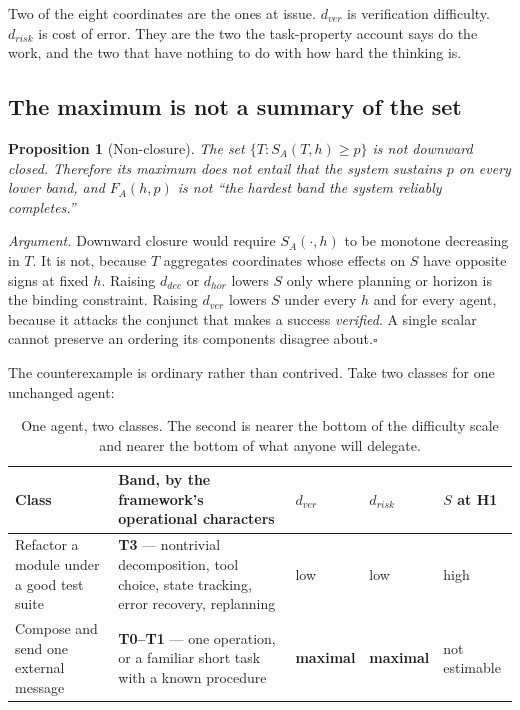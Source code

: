 \documentclass[11pt]{article}
\newtheorem{proposition}{Proposition}
\theoremstyle{definition}
\newcommand{\dver}{\ensuremath{d_{ver}}}
\newcommand{\drisk}{\ensuremath{d_{risk}}}
\begin{document}
Two of the eight coordinates are the ones at issue. \dver{} is verification difficulty. \drisk{} is cost of error. They are the two the task-property account says do the work, and the two that have nothing to do with how hard the thinking is.

\subsection{The maximum is not a summary of the set}\label{sec:closure}

\begin{proposition}[Non-closure]\label{prop:closure}
The set $\{T : S_A(T,h)\ge p\}$ is not downward closed. Therefore its maximum does not entail that the system sustains $p$ on every lower band, and $F_A(h,p)$ is not ``the hardest band the system reliably completes.''
\end{proposition}

\emph{Argument.} Downward closure would require $S_A(\cdot,h)$ to be monotone decreasing in $T$. It is not, because $T$ aggregates coordinates whose effects on $S$ have opposite signs at fixed $h$. Raising $d_{dec}$ or $d_{hor}$ lowers $S$ only where planning or horizon is the binding constraint. Raising \dver{} lowers $S$ under every $h$ and for every agent, because it attacks the conjunct that makes a success \emph{verified}. A single scalar cannot preserve an ordering its components disagree about.\hfill$\square$

The counterexample is ordinary rather than contrived. Take two classes for one unchanged agent:

\begin{table}[h]
\centering\small
\begin{tabularx}{\textwidth}{@{}lYlll@{}}
\toprule
Class & Band, by the framework's operational characters & \dver{} & \drisk{} & $S$ at H1 \\
\midrule
Refactor a module under a good test suite & \textbf{T3} --- nontrivial decomposition, tool choice, state tracking, error recovery, replanning & low & low & high \\
Compose and send one external message & \textbf{T0--T1} --- one operation, or a familiar short task with a known procedure & \textbf{maximal} & \textbf{maximal} & not estimable \\
\bottomrule
\end{tabularx}
\caption{One agent, two classes. The second is nearer the bottom of the difficulty scale and nearer the bottom of what anyone will delegate.}
\end{table}
\end{document}
